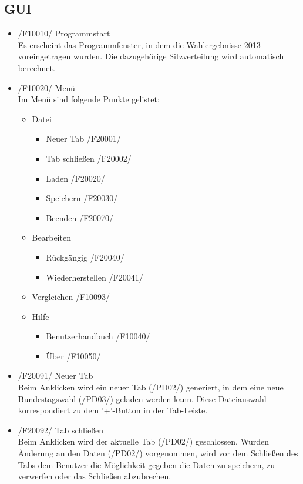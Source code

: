 \documentclass[10pt,a4paper]{article}
\begin{document}
\subsection{GUI}
\begin{itemize}
	\item /F10010/ Programmstart \hfill \\
	Es erscheint das Programmfenster, in dem die Wahlergebnisse 2013 voreingetragen wurden. Die dazugehörige Sitzverteilung wird automatisch berechnet.
	\item /F10020/ Menü \hfill \\
	Im Menü sind folgende Punkte gelistet:
	\begin{itemize}
		\item Datei
		\begin{itemize}
			\item Neuer Tab /F20001/
			\item Tab schließen /F20002/
			\item Laden /F20020/
			\item Speichern /F20030/
			\item Beenden /F20070/
		\end{itemize}
		\item Bearbeiten
		\begin{itemize}
			\item Rückgängig /F20040/
			\item Wiederherstellen /F20041/
		\end{itemize}
		\item Vergleichen /F10093/
		\item Hilfe
		\begin{itemize}
			\item Benutzerhandbuch /F10040/
			\item Über /F10050/
		\end{itemize}	
	\end{itemize}
	\item /F20091/ Neuer Tab \hfill \\
	Beim Anklicken wird ein neuer Tab (/PD02/) generiert, in dem eine neue Bundestagswahl (/PD03/) geladen werden kann. Diese Dateiauswahl korrespondiert zu dem '+'-Button in der Tab-Leiste.
	\item /F20092/ Tab schließen \hfill \\
	Beim Anklicken wird der aktuelle Tab (/PD02/) geschlossen. Wurden Änderung an den Daten (/PD02/) vorgenommen, wird vor dem Schließen des Tabs dem Benutzer die Möglichkeit gegeben die Daten zu speichern, zu verwerfen oder das Schließen abzubrechen.

\end{itemize}
\end{document}
